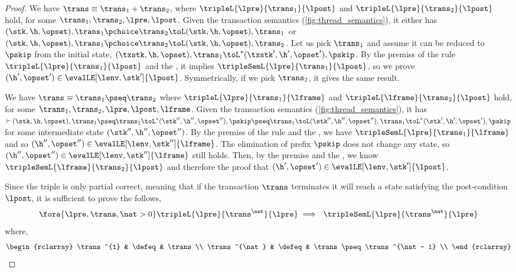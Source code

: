 \begin{proof}

We have  \(\trans \equiv \trans_{1} + \trans_{2} \), where \( \tripleL{\lpre}{\trans_{1}}{\lpost} \) and \( \tripleL{\lpre}{\trans_{2}}{\lpost} \) hold, for some \( \trans_{1}, \trans_{2}, \lpre, \lpost \).
Given the transaction semantics (\cref{fig:thread_semantics}), it either has \( ( \stk, \h, \opset ), \trans_{1} \pchoice \trans_{2} \toL ( \stk, \h, \opset ), \trans_{1} \) or  \( ( \stk, \h, \opset ), \trans_{1} \pchoice \trans_{2} \toL ( \stk, \h, \opset ), \trans_{2} \).
Let us pick \( \trans_{1} \) and  assume it can be reduced to \( \pskip \) from the initial state, \ie \( ( \txstk, \h, \opset ), \trans_{1}  \toL^{*} ( \txstk', \h', \opset' ), \pskip \).
By the premiss of the rule \( \tripleL{\lpre}{\trans_{1}}{\lpost} \) and the \ih, it implies \( \tripleSemL{\lpre}{\trans_{1}}{\lpost} \), so we prove \( (\h', \opset') \in \evalLE[\lenv, \stk']{\lpost} \).
Symmetrically, if we pick \( \trans_{2} \), it gives the same result.


We have \( \trans \equiv \trans_{1} \pseq \trans_{2} \) where \( \tripleL{\lpre}{\trans_{1}}{\lframe} \) and \( \tripleL{\lframe}{\trans_{2}}{\lpost} \) hold, for some \( \trans_{1}, \trans_{2}, \lpre, \lpost, \lframe \).
Given the transaction semantics (\cref{fig:thread_semantics}), it has \( \vdash ( \stk, \h, \opset ), \trans_{1} \pseq \trans_{2} \toL^{*} ( \stk'', \h'', \opset'' ), \pskip \pseq \trans_{1} \toL ( \stk'', \h'', \opset'' ), \trans_{1} \toL^{*} ( \stk', \h', \opset' ), \pskip \) for some intermediate state \( (\stk'', \h'', \opset'') \).
By the premiss of the rule and the \ih, we have \( \tripleSemL{\lpre}{\trans_{1}}{\lframe} \) and so \( (\h'', \opset'') \in \evalLE[\lenv, \stk'']{\lframe} \).
The elimination of prefix \( \pskip\) does not change any state, so \( (\h'', \opset'') \in \evalLE[\lenv, \stk'']{\lframe} \) still holds.
Then, by the premiss and the \ih, we know \( \tripleSemL{\lframe}{\trans_{2}}{\lpost} \) and therefore the proof that \( (\h', \opset') \in \evalLE[\lenv, \stk']{\lpost} \).


Since the triple is only partial correct, meaning that if the transaction \( \trans \) terminates it will reach a state satisfying the post-condition \( \lpost \), it is sufficient to prove the follows,
\[
    \fora{\lpre, \trans, \nat > 0} \tripleL{\lpre}{\trans^{\nat}}{\lpre} \implies \ \tripleSemL{\lpre}{\trans^{\nat}}{\lpre} 
\]
where,
\[
\begin{rclarray}
    \trans^{1} & \defeq  & \trans \\
    \trans^{\nat} & \defeq  & \trans \pseq \trans^{\nat - 1} \\
\end{rclarray}
\]


\end{proof}
